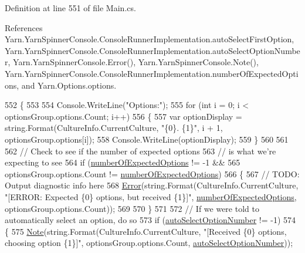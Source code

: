 Definition at line 551 of file Main.\-cs.



References Yarn.\-Yarn\-Spinner\-Console.\-Console\-Runner\-Implementation.\-auto\-Select\-First\-Option, Yarn.\-Yarn\-Spinner\-Console.\-Console\-Runner\-Implementation.\-auto\-Select\-Option\-Number, Yarn.\-Yarn\-Spinner\-Console.\-Error(), Yarn.\-Yarn\-Spinner\-Console.\-Note(), Yarn.\-Yarn\-Spinner\-Console.\-Console\-Runner\-Implementation.\-number\-Of\-Expected\-Options, and Yarn.\-Options.\-options.


\begin{DoxyCode}
552             \{
553 
554                 Console.WriteLine(\textcolor{stringliteral}{"Options:"});
555                 \textcolor{keywordflow}{for} (\textcolor{keywordtype}{int} i = 0; i < optionsGroup.options.Count; i++)
556                 \{
557                     var optionDisplay = string.Format(CultureInfo.CurrentCulture, \textcolor{stringliteral}{"\{0\}. \{1\}"}, i + 1, 
      optionsGroup.options[i]);
558                     Console.WriteLine(optionDisplay);
559                 \}
560 
561 
562                 \textcolor{comment}{// Check to see if the number of expected options}
563                 \textcolor{comment}{// is what we're expecting to see}
564                 \textcolor{keywordflow}{if} (\hyperlink{a00055_a2e17937195ecd64d5d867d958c45d2c3}{numberOfExpectedOptions} != -1 &&
565                     optionsGroup.options.Count != \hyperlink{a00055_a2e17937195ecd64d5d867d958c45d2c3}{numberOfExpectedOptions})
566                 \{
567                     \textcolor{comment}{// TODO: Output diagnostic info here}
568                     \hyperlink{a00174_a2f63f9f5b7634cb50ee75ff2eb18b137}{Error}(\textcolor{keywordtype}{string}.Format(CultureInfo.CurrentCulture, \textcolor{stringliteral}{"[ERROR: Expected \{0\} options, but
       received \{1\}]"}, \hyperlink{a00055_a2e17937195ecd64d5d867d958c45d2c3}{numberOfExpectedOptions}, optionsGroup.options.Count));
569 
570                 \}
571 
572                 \textcolor{comment}{// If we were told to automatically select an option, do so}
573                 \textcolor{keywordflow}{if} (\hyperlink{a00055_a34886671e91a1bf3fc225eeb67baced1}{autoSelectOptionNumber} != -1)
574                 \{
575                     \hyperlink{a00174_a939cc9e943c574b36c6af93e9c772702}{Note}(\textcolor{keywordtype}{string}.Format(CultureInfo.CurrentCulture, \textcolor{stringliteral}{"[Received \{0\} options, choosing
       option \{1\}]"}, optionsGroup.options.Count, \hyperlink{a00055_a34886671e91a1bf3fc225eeb67baced1}{autoSelectOptionNumber}));

\end{DoxyCode}
